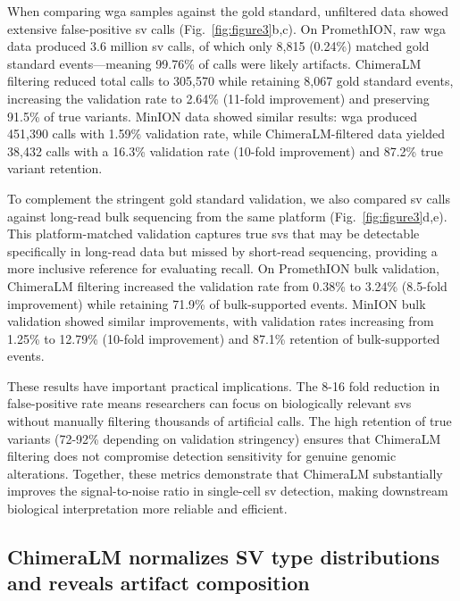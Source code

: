 \documentclass[pdflatex,sn-nature,lineno]{sn-jnl}%
\theoremstyle{thmstyleone}%
\theoremstyle{thmstyletwo}%
\theoremstyle{thmstylethree}%
\begin{document}
When comparing \gls{wga} samples against the gold standard, unfiltered data showed extensive false-positive \gls{sv} calls (Fig.~\ref{fig:figure3}b,c).
On PromethION, raw \gls{wga} data produced 3.6 million \gls{sv} calls, of which only 8,815 (0.24\%) matched gold standard events—meaning 99.76\% of calls were likely artifacts.
ChimeraLM filtering reduced total calls to 305,570 while retaining 8,067 gold standard events, increasing the validation rate to 2.64\% (11-fold improvement) and preserving 91.5\% of true variants.
MinION data showed similar results: \gls{wga} produced 451,390 calls with 1.59\% validation rate, while ChimeraLM-filtered data yielded 38,432 calls with a 16.3\% validation rate (10-fold improvement) and 87.2\% true variant retention.

To complement the stringent gold standard validation, we also compared \gls{sv} calls against long-read bulk sequencing from the same platform (Fig.~\ref{fig:figure3}d,e).
This platform-matched validation captures true \glspl{sv} that may be detectable specifically in long-read data but missed by short-read sequencing, providing a more inclusive reference for evaluating recall.
On PromethION bulk validation, ChimeraLM filtering increased the validation rate from 0.38\% to 3.24\% (8.5-fold improvement) while retaining 71.9\% of bulk-supported events.
MinION bulk validation showed similar improvements, with validation rates increasing from 1.25\% to 12.79\% (10-fold improvement) and 87.1\% retention of bulk-supported events.

These results have important practical implications.
The 8-16 fold reduction in false-positive rate means researchers can focus on biologically relevant \glspl{sv} without manually filtering thousands of artificial calls.
The high retention of true variants (72-92\% depending on validation stringency) ensures that ChimeraLM filtering does not compromise detection sensitivity for genuine genomic alterations. Together, these metrics demonstrate that ChimeraLM substantially improves the signal-to-noise ratio in single-cell \gls{sv} detection, making downstream biological interpretation more reliable and efficient.


\subsection*{ChimeraLM normalizes SV type distributions and reveals artifact composition}
\end{document}

